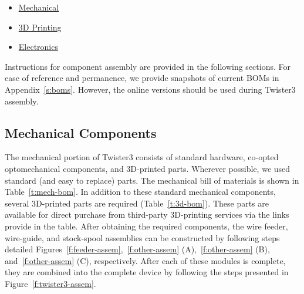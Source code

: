 \documentclass[11pt,a4paper]{article}
\begin{document}
\begin{itemize}[noitemsep]
    \item \href{https://docs.google.com/spreadsheets/d/1tdc3wfE6V87q8yqBOQvDj7WylAztkh6_2kuL-YzyB0g/edit#gid=1299007471}{Mechanical}
    \item \href{https://docs.google.com/spreadsheets/d/1tdc3wfE6V87q8yqBOQvDj7WylAztkh6_2kuL-YzyB0g/edit#gid=587676485}{3D Printing}
    \item \href{https://docs.google.com/spreadsheets/d/1tdc3wfE6V87q8yqBOQvDj7WylAztkh6_2kuL-YzyB0g/edit#gid=0}{Electronics}
\end{itemize}

Instructions for component assembly are provided in the following sections. For
ease of reference and permanence, we provide snapshots of current BOMs in
Appendix~\ref{s:boms}. However, the online versions should be used during
Twister3 assembly.

\subsection{Mechanical Components}
The mechanical portion of Twister3 consists of standard hardware, co-opted
optomechanical components, and 3D-printed parts.  Wherever possible, we used
standard (and easy to replace) parts. The mechanical bill of materials is shown
in Table~\ref{t:mech-bom}. In addition to these standard mechanical components,
several 3D-printed parts are required (Table~\ref{t:3d-bom}). These parts are
available for direct purchase from third-party 3D-printing services via the
links provide in the table.  After obtaining the required components, the wire
feeder, wire-guide, and stock-spool assemblies can be constructed by following
steps detailed Figures~\ref{f:feeder-assem},~\ref{f:other-assem}
(A),~\ref{f:other-assem} (B), and~\ref{f:other-assem} (C), respectively. After
each of these modules is complete, they are combined into the complete device
by following the steps presented in Figure~\ref{f:twister3-assem}.
\end{document}

